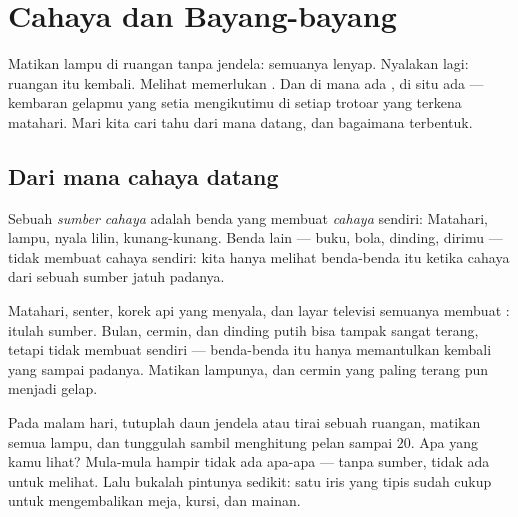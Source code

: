 \chapter{Cahaya dan Bayang-bayang}\label{ch:g1:light-and-shadows}

Matikan lampu di ruangan tanpa jendela: semuanya lenyap. Nyalakan
lagi: ruangan itu kembali. Melihat memerlukan . Dan di mana ada
, di situ ada  --- kembaran gelapmu yang setia
mengikutimu di setiap trotoar yang terkena matahari. Mari kita cari
tahu dari mana  datang, dan bagaimana  terbentuk.

\section{Dari mana cahaya datang}

\begin{definition}\label{def:g1:light-and-shadows:source}
Sebuah \emph{sumber cahaya} adalah benda yang
membuat \emph{cahaya} sendiri: Matahari, lampu, nyala
lilin, kunang-kunang. Benda lain --- buku, bola, dinding, dirimu ---
tidak membuat cahaya sendiri: kita hanya melihat benda-benda itu
ketika cahaya dari sebuah sumber jatuh padanya.
\end{definition}

\begin{example}\label{ex:g1:light-and-shadows:sources}
Matahari, senter, korek api yang menyala, dan layar televisi semuanya
membuat : itulah sumber. Bulan, cermin, dan dinding putih bisa
tampak sangat terang, tetapi tidak membuat  sendiri ---
benda-benda itu hanya memantulkan kembali  yang sampai padanya.
Matikan lampunya, dan cermin yang paling terang pun menjadi gelap.
\end{example}

\begin{example}\label{ex:g1:light-and-shadows:darkroom}
Pada malam hari, tutuplah daun jendela atau tirai sebuah ruangan,
matikan semua lampu, dan tunggulah sambil menghitung pelan sampai
$20$. Apa yang kamu lihat? Mula-mula hampir tidak ada apa-apa ---
tanpa sumber, tidak ada  untuk melihat. Lalu bukalah pintunya
sedikit: satu iris  yang tipis sudah cukup untuk mengembalikan
meja, kursi, dan mainan.
\end{example}

